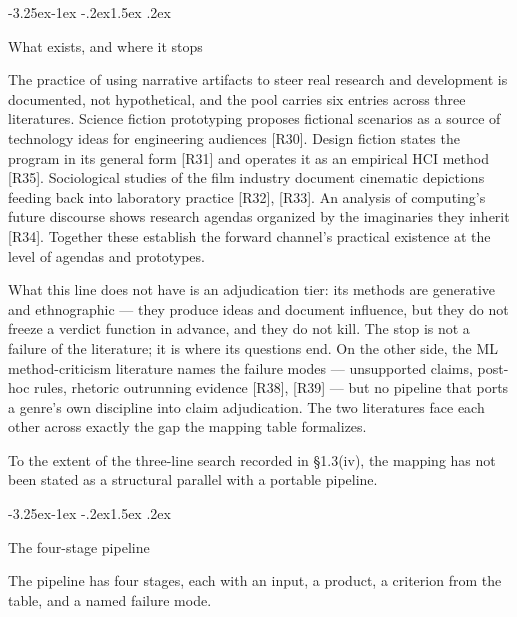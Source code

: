 \documentclass[11pt,a4paper]{article}
\makeatletter
\renewcommand\subsection{\@startsection{subsection}{2}{\z@}%
  {-3.25ex\@plus -1ex \@minus -.2ex}{1.5ex \@plus .2ex}%
  {\normalfont\large\bfseries\raggedright}}
\makeatother
\begin{document}
\subsection{What exists, and where it stops}

The practice of using narrative artifacts to steer real research and development is documented, not hypothetical, and the pool carries six entries across three literatures. Science fiction prototyping proposes fictional scenarios as a source of technology ideas for engineering audiences [R30]. Design fiction states the program in its general form [R31] and operates it as an empirical HCI method [R35]. Sociological studies of the film industry document cinematic depictions feeding back into laboratory practice [R32], [R33]. An analysis of computing's future discourse shows research agendas organized by the imaginaries they inherit [R34]. Together these establish the forward channel's practical existence at the level of agendas and prototypes.

What this line does not have is an adjudication tier: its methods are generative and ethnographic — they produce ideas and document influence, but they do not freeze a verdict function in advance, and they do not kill. The stop is not a failure of the literature; it is where its questions end. On the other side, the ML method-criticism literature names the failure modes — unsupported claims, post-hoc rules, rhetoric outrunning evidence [R38], [R39] — but no pipeline that ports a genre's own discipline into claim adjudication. The two literatures face each other across exactly the gap the mapping table formalizes.

To the extent of the three-line search recorded in §1.3(iv), the mapping has not been stated as a structural parallel with a portable pipeline.

\subsection{The four-stage pipeline}

The pipeline has four stages, each with an input, a product, a criterion from the table, and a named failure mode.
\end{document}
